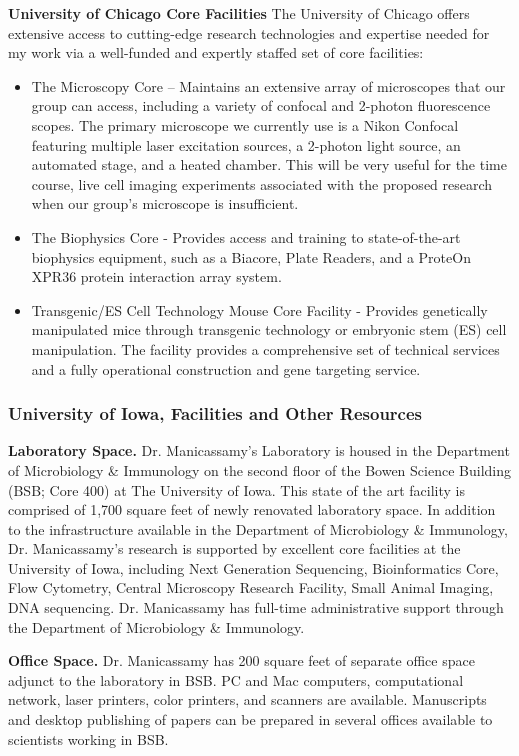 \documentclass[onecolumn, compsoc,12pt]{IEEEtran}
\begin{document}
\textbf{University of Chicago Core Facilities} The University of Chicago offers extensive access to cutting-edge research technologies and expertise needed for my work via a well-funded and expertly staffed set of core facilities:
\begin{itemize}
\item The Microscopy Core – Maintains an extensive array of microscopes that our group can access, including a variety of confocal and 2-photon fluorescence scopes. The primary microscope we currently use is a Nikon Confocal featuring multiple laser excitation sources, a 2-photon light source, an automated stage, and a heated chamber. This will be very useful for the time course, live cell imaging experiments associated with the proposed research when our group’s microscope is insufficient. 
\item The Biophysics Core - Provides access and training to state-of-the-art biophysics equipment, such as a Biacore, Plate Readers, and a ProteOn XPR36 protein interaction array system.
\item  Transgenic/ES Cell Technology Mouse Core Facility - Provides genetically manipulated mice through transgenic technology or embryonic stem (ES) cell manipulation. The facility provides a comprehensive set of technical services and a fully operational construction and gene targeting service.

\end{itemize}


\subsubsection*{University of Iowa, Facilities and Other Resources}

\textbf{Laboratory Space.} Dr. Manicassamy's Laboratory is housed in the Department of Microbiology \& Immunology on the second floor
of the Bowen Science Building (BSB; Core 400) at The University of Iowa. This state of the art facility is
comprised of 1,700 square feet of newly renovated laboratory space. In addition to the infrastructure available
in the Department of Microbiology \& Immunology, Dr. Manicassamy’s research is supported by excellent core
facilities at the University of Iowa, including Next Generation Sequencing, Bioinformatics Core, Flow
Cytometry, Central Microscopy Research Facility, Small Animal Imaging, DNA sequencing. Dr. Manicassamy
has full-time administrative support through the Department of Microbiology \& Immunology.


\textbf{Office Space.} Dr. Manicassamy has 200 square feet of separate office space adjunct to the laboratory in BSB. PC and Mac
computers, computational network, laser printers, color printers, and scanners are available. Manuscripts and
desktop publishing of papers can be prepared in several offices available to scientists working in BSB.
\end{document}
